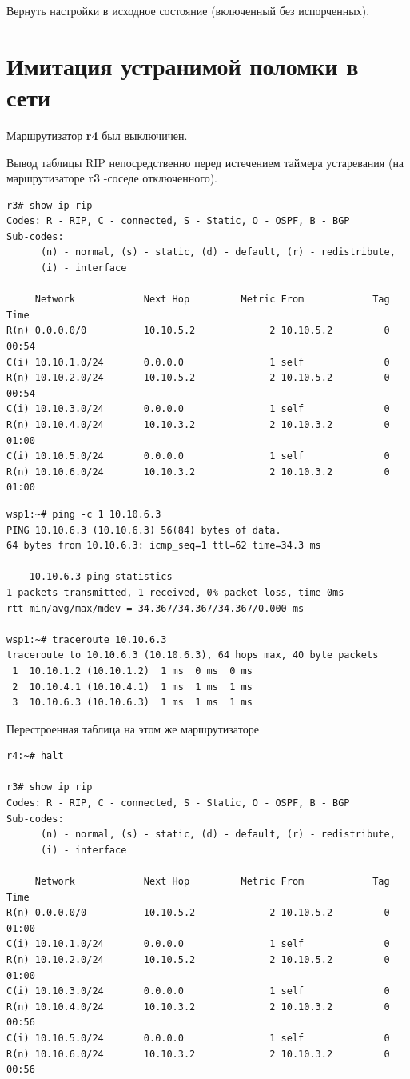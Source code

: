 \documentclass[a4paper,12pt]{article}
\begin{document}
Вернуть настройки в исходное состояние (включенный без испорченных).


\section{Имитация устранимой поломки в сети}

Маршрутизатор \textbf{r4} был выключичен.

Вывод таблицы RIP непосредственно перед истечением таймера устаревания (на маршрутизаторе \textbf{r3} -соседе отключенного).

\begin{Verbatim}
r3# show ip rip
Codes: R - RIP, C - connected, S - Static, O - OSPF, B - BGP
Sub-codes:
      (n) - normal, (s) - static, (d) - default, (r) - redistribute,
      (i) - interface

     Network            Next Hop         Metric From            Tag Time
R(n) 0.0.0.0/0          10.10.5.2             2 10.10.5.2         0 00:54
C(i) 10.10.1.0/24       0.0.0.0               1 self              0
R(n) 10.10.2.0/24       10.10.5.2             2 10.10.5.2         0 00:54
C(i) 10.10.3.0/24       0.0.0.0               1 self              0
R(n) 10.10.4.0/24       10.10.3.2             2 10.10.3.2         0 01:00
C(i) 10.10.5.0/24       0.0.0.0               1 self              0
R(n) 10.10.6.0/24       10.10.3.2             2 10.10.3.2         0 01:00
\end{Verbatim}

\begin{Verbatim}
wsp1:~# ping -c 1 10.10.6.3
PING 10.10.6.3 (10.10.6.3) 56(84) bytes of data.
64 bytes from 10.10.6.3: icmp_seq=1 ttl=62 time=34.3 ms

--- 10.10.6.3 ping statistics ---
1 packets transmitted, 1 received, 0% packet loss, time 0ms
rtt min/avg/max/mdev = 34.367/34.367/34.367/0.000 ms

wsp1:~# traceroute 10.10.6.3
traceroute to 10.10.6.3 (10.10.6.3), 64 hops max, 40 byte packets
 1  10.10.1.2 (10.10.1.2)  1 ms  0 ms  0 ms
 2  10.10.4.1 (10.10.4.1)  1 ms  1 ms  1 ms
 3  10.10.6.3 (10.10.6.3)  1 ms  1 ms  1 ms
\end{Verbatim}

Перестроенная таблица на этом же маршрутизаторе

\begin{Verbatim}
r4:~# halt

r3# show ip rip
Codes: R - RIP, C - connected, S - Static, O - OSPF, B - BGP
Sub-codes:
      (n) - normal, (s) - static, (d) - default, (r) - redistribute,
      (i) - interface

     Network            Next Hop         Metric From            Tag Time
R(n) 0.0.0.0/0          10.10.5.2             2 10.10.5.2         0 01:00
C(i) 10.10.1.0/24       0.0.0.0               1 self              0
R(n) 10.10.2.0/24       10.10.5.2             2 10.10.5.2         0 01:00
C(i) 10.10.3.0/24       0.0.0.0               1 self              0
R(n) 10.10.4.0/24       10.10.3.2             2 10.10.3.2         0 00:56
C(i) 10.10.5.0/24       0.0.0.0               1 self              0
R(n) 10.10.6.0/24       10.10.3.2             2 10.10.3.2         0 00:56
\end{Verbatim}
\end{document}
